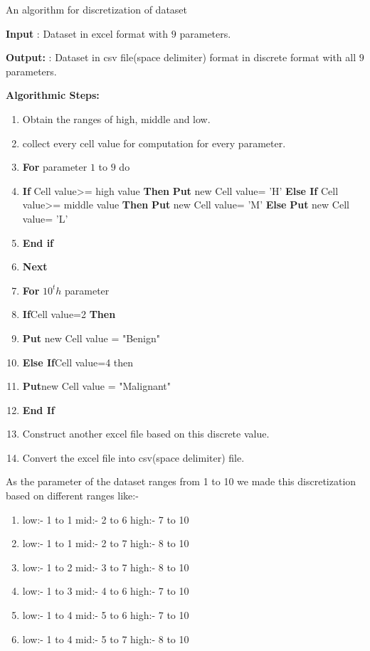 \documentclass[11pt]{article}
\begin{document}
\begin{algorithm}[H]
\caption{An algorithm for discretization  of dataset}


\textbf{Input} : Dataset in excel format with $9$ parameters.

\textbf{Output:} : Dataset in csv file(space delimiter) format in discrete format with all $9$ parameters.

\textbf{Algorithmic Steps:}
\begin{enumerate}
  \item Obtain the ranges of high, middle and low.
  \item collect every cell value for computation for every parameter.
  \item \textbf{For} parameter $1$ to $9$ do
  \item \textbf{If} Cell value>= high value \textbf{Then}
            \textbf{Put} new Cell value= 'H'
            \textbf{Else If} Cell value>= middle value \textbf{Then}
             \textbf{Put} new Cell value= 'M'
             \textbf{Else}
             \textbf{Put} new Cell value= 'L'
  \item \textbf{End if}
  \item \textbf{Next}
  \item \textbf{For} $10^th$ parameter
  \item \textbf{If}Cell value=2 \textbf{Then}
  \item \textbf{Put} new Cell value = "Benign"
  \item \textbf{Else If}Cell value=4 then
  \item \textbf{Put}new Cell value = "Malignant"
  \item \textbf{End If}
  \item Construct another excel file based on this discrete value.
  \item Convert the excel file into csv(space delimiter) file.
\end{enumerate}

\end{algorithm}



As the parameter of the dataset ranges from 1 to 10 we made this discretization based on different ranges like:-

\begin{enumerate}
\item low:- 1 to 1 mid:- 2 to 6 high:- 7 to 10
\item low:- 1 to 1 mid:- 2 to 7 high:- 8 to 10
\item low:- 1 to 2 mid:- 3 to 7 high:- 8 to 10
\item low:- 1 to 3 mid:- 4 to 6 high:- 7 to 10
\item low:- 1 to 4 mid:- 5 to 6 high:- 7 to 10
\item low:- 1 to 4 mid:- 5 to 7 high:- 8 to 10
\end{enumerate}
\end{document}
